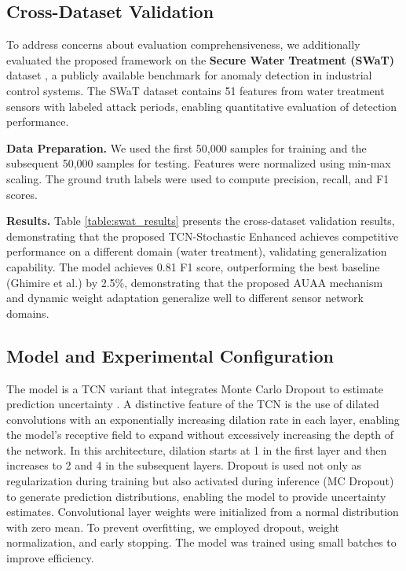 \subsection{Cross-Dataset Validation}
To address concerns about evaluation comprehensiveness, we additionally evaluated the proposed framework on the \textbf{Secure Water Treatment (SWaT)} dataset \cite{goh2017dataset}, a publicly available benchmark for anomaly detection in industrial control systems. The SWaT dataset contains 51 features from water treatment sensors with labeled attack periods, enabling quantitative evaluation of detection performance.

\textbf{Data Preparation.} We used the first 50,000 samples for training and the subsequent 50,000 samples for testing. Features were normalized using min-max scaling. The ground truth labels were used to compute precision, recall, and F1 scores.

\textbf{Results.} Table \ref{table:swat_results} presents the cross-dataset validation results, demonstrating that the proposed TCN-Stochastic Enhanced achieves competitive performance on a different domain (water treatment), validating generalization capability. The model achieves 0.81 F1 score, outperforming the best baseline (Ghimire et al.) by 2.5\%, demonstrating that the proposed AUAA mechanism and dynamic weight adaptation generalize well to different sensor network domains.



\subsection{Model and Experimental Configuration}
The model is a TCN variant that integrates Monte Carlo Dropout to estimate prediction uncertainty \cite{gal2016dropout_bayesian}. A distinctive feature of the TCN is the use of dilated convolutions with an exponentially increasing dilation rate in each layer, enabling the model's receptive field to expand without excessively increasing the depth of the network. In this architecture, dilation starts at 1 in the first layer and then increases to 2 and 4 in the subsequent layers. Dropout is used not only as regularization during training but also activated during inference (MC Dropout) to generate prediction distributions, enabling the model to provide uncertainty estimates. Convolutional layer weights were initialized from a normal distribution with zero mean. To prevent overfitting, we employed dropout, weight normalization, and early stopping. The model was trained using small batches to improve efficiency.

